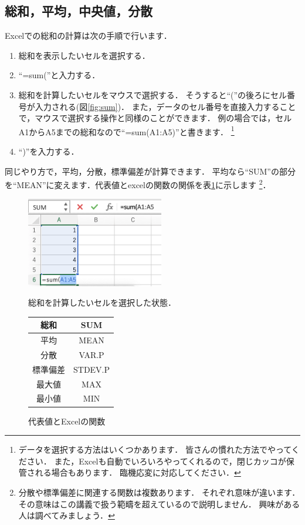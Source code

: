\subsection{総和，平均，中央値，分散}

Excelでの総和の計算は次の手順で行います．

\begin{enumerate}
    \item 総和を表示したいセルを選択する．
    \item ``=sum(''と入力する．
    \item 総和を計算したいセルをマウスで選択する．
    そうすると``(''の後ろにセル番号が入力される(図\ref{fig:sum})．
    また，データのセル番号を直接入力することで，マウスで選択する操作と同様のことができます．
    例の場合では，セルA1からA5までの総和なので``=sum(A1:A5)''と書きます．
    \footnote{データを選択する方法はいくつかあります．
      皆さんの慣れた方法でやってください．
      また，Excelも自動でいろいろやってくれるので，閉じカッコが保管される場合もあります．
      臨機応変に対応してください．}
    \item ``)''を入力する．
\end{enumerate}

同じやり方で，平均，分散，標準偏差が計算できます．
平均なら``SUM''の部分を``MEAN''に変えます．代表値とexcelの関数の関係を表\ref{tab:funcs}に示します
\footnote{分散や標準偏差に関連する関数は複数あります．
  それぞれ意味が違います．
  その意味はこの講義で扱う範疇を超えているので説明しません．
  興味がある人は調べてみましょう．}．

\begin{figure}[htbp]
    \begin{minipage}{0.5\hsize}
        \centering
        \includegraphics[width=6cm]{chap1/sum.png}
        \caption{総和を計算したいセルを選択した状態．}
        \label{fig:sum}
    \end{minipage}
    \begin{minipage}{0.5\hsize}
        \centering
        \makeatletter
        \def\@captype{table}
        \makeatother
        \caption{代表値とExcelの関数}
        \begin{tabular}{|c|c|}
          \hline
          総和     & SUM\\ \hline
          平均     & MEAN\\ \hline
          分散     & VAR.P\\ \hline
          標準偏差 & STDEV.P \\ \hline
          最大値   & MAX \\ \hline
          最小値   & MIN \\ \hline
        \end{tabular}
        \label{tab:funcs}
    \end{minipage}
\end{figure}

